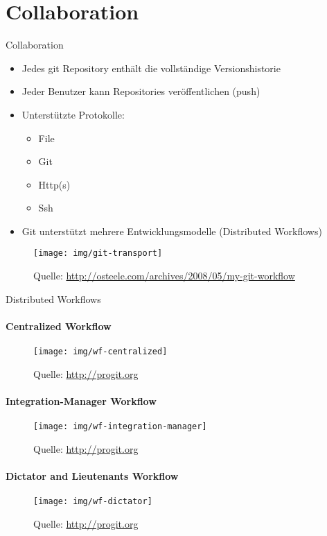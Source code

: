 \section{Collaboration}

\begin{frame}
  \tableofcontents[currentsection]
\end{frame}

\begin{frame}{Collaboration}
  \begin{itemize}
    \item Jedes git Repository enthält die vollständige Versionshistorie
    \item Jeder Benutzer kann Repositories veröffentlichen (push)
    \item Unterstützte Protokolle:
    \begin{itemize}
      \item File
      \item Git
      \item Http(s)
      \item Ssh
    \end{itemize}
    \item Git unterstützt mehrere Entwicklungsmodelle (Distributed Workflows)
  \end{itemize}
\end{frame}

\begin{frame}
  \begin{figure}
    \texttt{[image: img/git-transport]}
    \caption[format=empty]{Quelle: \url{http://osteele.com/archives/2008/05/my-git-workflow}}
  \end{figure}
  
\end{frame}

\begin{frame}[allowframebreaks]{Distributed Workflows}
  \framesubtitle{Centralized Workflow}
  \begin{figure}
    \texttt{[image: img/wf-centralized]}
    \caption[format=empty]{Quelle: \url{http://progit.org}}
  \end{figure}
  \framebreak
    
  \framesubtitle{Integration-Manager Workflow}
  \begin{figure}
    \texttt{[image: img/wf-integration-manager]}
    \caption[format=empty]{Quelle: \url{http://progit.org}}
  \end{figure}
  \framebreak

  \framesubtitle{Dictator and Lieutenants Workflow}
  \begin{figure}
   \texttt{[image: img/wf-dictator]}
    \caption[format=empty]{Quelle: \url{http://progit.org}}
  \end{figure}
\end{frame}

